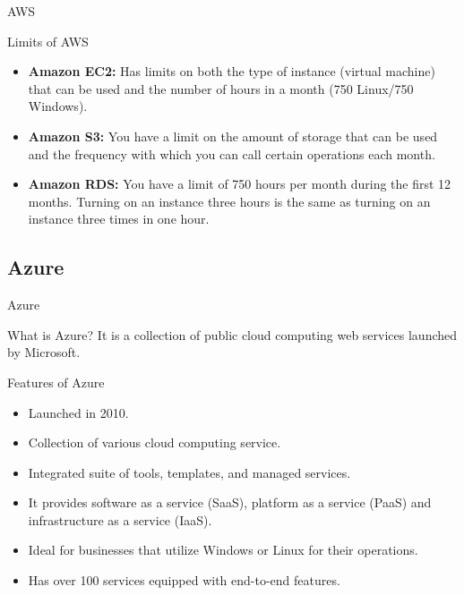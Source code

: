 \documentclass[aspectratio=169]{beamer}
\begin{document}
\begin{frame}{AWS}
	\begin{block}{Limits of AWS}
		\begin{itemize}
			\item \textbf{Amazon EC2:} Has limits on both the type of instance (virtual machine) that can be used and the number of hours in a month (750 Linux/750 Windows).
			\item \textbf {Amazon S3:} You have a limit on the amount of storage that can be used and the frequency with which you can call certain operations each month.
			\item \textbf{Amazon RDS:} You have a limit of 750 hours per month during the first 12 months. Turning on an instance three hours is the same as turning on an instance three times in one hour.
		\end{itemize}
	\end{block}
\end{frame}

\subsection{Azure}
\begin{frame}{Azure}
\begin{block}{What is Azure?}
	It is a collection of public cloud computing web services launched by Microsoft.
\end{block}
\begin{block}{Features of Azure}
	\begin{itemize}
		\item Launched in 2010.
		\item Collection of various cloud computing service.
		\item Integrated suite of tools, templates, and managed services.
		\item It provides software as a service (SaaS), platform as a service (PaaS) and infrastructure as a service (IaaS).
		\item Ideal for businesses that utilize Windows or Linux for their operations.
		\item Has over 100 services equipped with end-to-end features.
	\end{itemize}
\end{block}
\end{frame}
\end{document}
